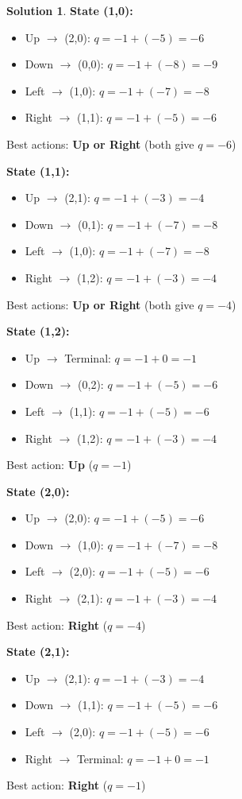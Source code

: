 \documentclass[11pt]{article}
\theoremstyle{definition}
\newtheorem*{solution}{Solution}
\begin{document}
\begin{solution}
\textbf{State (1,0):}
\begin{itemize}
    \item Up $\to$ (2,0): $q = -1 + (-5) = -6$
    \item Down $\to$ (0,0): $q = -1 + (-8) = -9$
    \item Left $\to$ (1,0): $q = -1 + (-7) = -8$
    \item Right $\to$ (1,1): $q = -1 + (-5) = -6$
\end{itemize}
Best actions: \textbf{Up or Right} (both give $q = -6$)

\textbf{State (1,1):}
\begin{itemize}
    \item Up $\to$ (2,1): $q = -1 + (-3) = -4$
    \item Down $\to$ (0,1): $q = -1 + (-7) = -8$
    \item Left $\to$ (1,0): $q = -1 + (-7) = -8$
    \item Right $\to$ (1,2): $q = -1 + (-3) = -4$
\end{itemize}
Best actions: \textbf{Up or Right} (both give $q = -4$)

\textbf{State (1,2):}
\begin{itemize}
    \item Up $\to$ Terminal: $q = -1 + 0 = -1$
    \item Down $\to$ (0,2): $q = -1 + (-5) = -6$
    \item Left $\to$ (1,1): $q = -1 + (-5) = -6$
    \item Right $\to$ (1,2): $q = -1 + (-3) = -4$
\end{itemize}
Best action: \textbf{Up} ($q = -1$)

\textbf{State (2,0):}
\begin{itemize}
    \item Up $\to$ (2,0): $q = -1 + (-5) = -6$
    \item Down $\to$ (1,0): $q = -1 + (-7) = -8$
    \item Left $\to$ (2,0): $q = -1 + (-5) = -6$
    \item Right $\to$ (2,1): $q = -1 + (-3) = -4$
\end{itemize}
Best action: \textbf{Right} ($q = -4$)

\textbf{State (2,1):}
\begin{itemize}
    \item Up $\to$ (2,1): $q = -1 + (-3) = -4$
    \item Down $\to$ (1,1): $q = -1 + (-5) = -6$
    \item Left $\to$ (2,0): $q = -1 + (-5) = -6$
    \item Right $\to$ Terminal: $q = -1 + 0 = -1$
\end{itemize}
Best action: \textbf{Right} ($q = -1$)


\end{solution}
\end{document}
